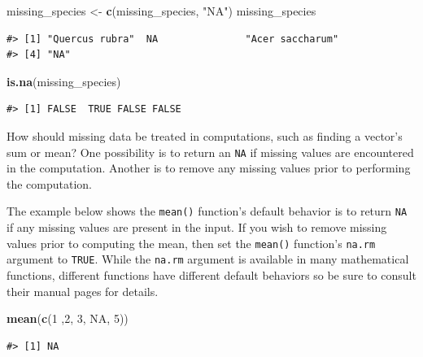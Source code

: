 \documentclass[
  11pt,
]{krantz}
\newenvironment{Shaded}{\begin{snugshade}}{\end{snugshade}}
\newcommand{\DecValTok}[1]{\textcolor[rgb]{0.00,0.00,0.81}{#1}}
\newcommand{\KeywordTok}[1]{\textcolor[rgb]{0.13,0.29,0.53}{\textbf{#1}}}
\newcommand{\NormalTok}[1]{#1}
\newcommand{\OtherTok}[1]{\textcolor[rgb]{0.56,0.35,0.01}{#1}}
\newcommand{\StringTok}[1]{\textcolor[rgb]{0.31,0.60,0.02}{#1}}
\theoremstyle{definition}
\theoremstyle{definition}
\theoremstyle{definition}
\theoremstyle{definition}
\theoremstyle{remark}
\begin{document}
\begin{Shaded}
\begin{Highlighting}[]
\NormalTok{missing\_species \textless{}{-}}\StringTok{ }\KeywordTok{c}\NormalTok{(missing\_species, }\StringTok{"NA"}\NormalTok{)}
\NormalTok{missing\_species}
\end{Highlighting}
\end{Shaded}

\begin{verbatim}
#> [1] "Quercus rubra"  NA               "Acer saccharum"
#> [4] "NA"
\end{verbatim}

\begin{Shaded}
\begin{Highlighting}[]
\KeywordTok{is.na}\NormalTok{(missing\_species)}
\end{Highlighting}
\end{Shaded}

\begin{verbatim}
#> [1] FALSE  TRUE FALSE FALSE
\end{verbatim}

How should missing data be treated in computations, such as finding a vector's sum or mean? One possibility is to return an \texttt{NA} if missing values are encountered in the computation. Another is to remove any missing values prior to performing the computation.

The example below shows the \texttt{mean()} function's default behavior is to return \texttt{NA} if any missing values are present in the input. If you wish to remove missing values prior to computing the mean, then set the \texttt{mean()} function's \texttt{na.rm} argument to \texttt{TRUE}. While the \texttt{na.rm} argument is available in many mathematical functions, different functions have different default behaviors so be sure to consult their manual pages for details.

\begin{Shaded}
\begin{Highlighting}[]
\KeywordTok{mean}\NormalTok{(}\KeywordTok{c}\NormalTok{(}\DecValTok{1}\NormalTok{ ,}\DecValTok{2}\NormalTok{, }\DecValTok{3}\NormalTok{, }\OtherTok{NA}\NormalTok{, }\DecValTok{5}\NormalTok{))}
\end{Highlighting}
\end{Shaded}

\begin{verbatim}
#> [1] NA
\end{verbatim}
\end{document}
